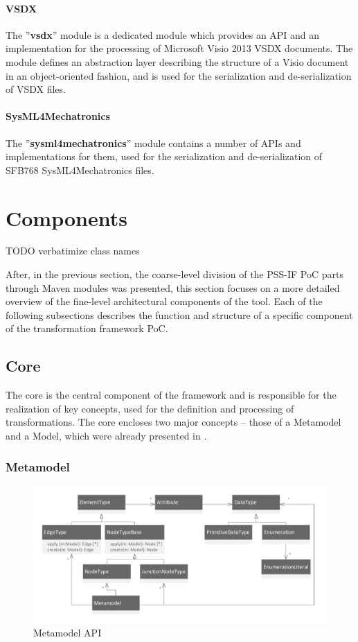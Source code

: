 \paragraph{VSDX} The ''\textbf{vsdx}'' module is a dedicated module which provides an API and an implementation for the processing of Microsoft Visio 2013 VSDX documents. The module defines an abstraction layer describing the structure of a Visio document in an object-oriented fashion, and is used for the serialization and de-serialization of VSDX files.

\paragraph{SysML4Mechatronics} The ''\textbf{sysml4mechatronics}'' module contains a number of APIs and implementations for them, used for the serialization and de-serialization of SFB768 SysML4Mechatronics files.

\section{Components}
\label{sec:impl:components}

\color{red} TODO verbatimize class names \color{black}

After, in the previous section, the coarse-level division of the PSS-IF PoC parts through Maven modules was presented, this section focuses on a more detailed overview of the fine-level architectural components of the tool. Each of the following subsections describes the function and structure of a specific component of the transformation framework PoC.

\subsection{Core}

The core is the central component of the framework and is responsible for the realization of key concepts, used for the definition and processing of transformations. The core encloses two major concepts -- those of a Metamodel and a Model, which were already presented in .

\subsubsection{Metamodel}

\begin{figure}
\centering
\includegraphics[width=\textwidth]{figures/metamodel.pdf}
\caption{Metamodel API}
\label{fig:metamodel}
\end{figure}

